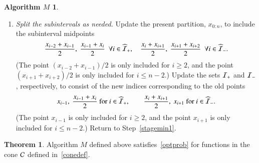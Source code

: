 \documentclass[review]{elsarticle}
\theoremstyle{definition}
\newtheorem*{algoM}{Algorithm $M$}
\newtheorem{theorem}{Theorem}
\begin{document}
\begin{algoM}
\begin{enumerate}[\em Step 1.]
		\item \label{stagemin2} \emph{Split the subintervals as needed.}
		Update the present partition, $x_{0:n}$, to include the subinterval midpoints
		\begin{equation*}
		\frac{x_{i-2} +x_{i-1}}{2}, \ \frac{x_{i-1} +x_{i}}{2} \ \ \forall i \in \widehat{\ci}_+, \quad
		\frac{x_{i} +x_{i+1}}{2}, \  \frac{x_{i+1} +x_{i+2}}{2} \ \ \forall  i \in \widehat{\ci}_-.
		\end{equation*}
		(The point $(x_{i-2}+x_{i-1})/2$ is only included for $i \ge 2$, and the point
		$(x_{i+1} +x_{i+2})/2$ is only included for $i \le n-2$.)  Update the sets
		 $\mathcal{I}_{+}$ and $\mathcal{I}_-$,
		respectively, to consist of the new indices corresponding to the old points
		\[
		x_{i-1}, \ \frac{x_{i-1} +x_{i}}{2} \text{ for } i \in \widehat{\mathcal{I}}_+, \qquad
		\frac{x_{i} +x_{i+1}}{2}, \  x_{i+1} \text{ for } i \in \widehat{\mathcal{I}}_-.
		\]
		(The point $x_{i-1}$ is only included for $i \ge 2$, and the point $x_{i+1}$ is only
		included for $i \le n-2$.) Return to Step~\ref{stagemin1}.
	\end{enumerate}
\end{algoM}

\begin{theorem} \label{thm:algMworks}
Algorithm $M$ defined above satisfies~\eqref{optprob} for functions in the
cone $\mathcal{C}$ defined in~\eqref{conedef}.
\end{theorem}
\end{document}
